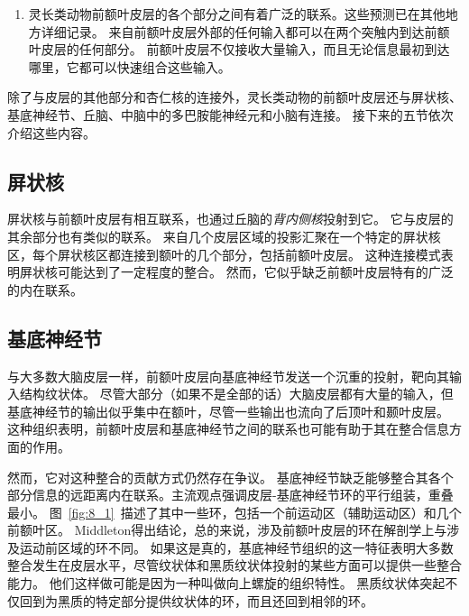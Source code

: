 \begin{enumerate}
\item 灵长类动物前额叶皮层的各个部分之间有着广泛的联系。这些预测已在其他地方详细记录\cite{barbas1988anatomic,carmichael1995sensory,barbas1999medial,petrides1999dorsolateral,petrides2002association,price1999delineating}。
来自前额叶皮层外部的任何输入都可以在两个突触内到达前额叶皮层的任何部分\cite{averbeck2008statistical}。
前额叶皮层不仅接收大量输入，而且无论信息最初到达哪里，它都可以快速组合这些输入。
\end{enumerate}
\par


除了与皮层的其他部分和杏仁核的连接外，灵长类动物的前额叶皮层还与屏状核、基底神经节、丘脑、中脑中的多巴胺能神经元和小脑有连接。
接下来的五节依次介绍这些内容。



\subsection{屏状核}
\par

屏状核与前额叶皮层有相互联系\cite{tanne2002projections}，也通过丘脑的\textit{背内侧核}投射到它\cite{erickson2004subcortical}。
它与皮层的其余部分也有类似的联系。
来自几个皮层区域的投影汇聚在一个特定的屏状核区，每个屏状核区都连接到额叶的几个部分，包括前额叶皮层\cite{tanne2002projections}。
这种连接模式表明屏状核可能达到了一定程度的整合。
然而，它似乎缺乏前额叶皮层特有的广泛的内在联系。



\subsection{基底神经节}
\par

与大多数大脑皮层一样，前额叶皮层向基底神经节发送一个沉重的投射，靶向其输入结构纹状体。
尽管大部分（如果不是全部的话）大脑皮层都有大量的输入，但基底神经节的输出似乎集中在额叶，尽管一些输出也流向了后顶叶\cite{clower2005basal}和颞叶皮层\cite{middleton1996temporal}。
这种组织表明，前额叶皮层和基底神经节之间的联系也可能有助于其在整合信息方面的作用。
\par


然而，它对这种整合的贡献方式仍然存在争议。
基底神经节缺乏能够整合其各个部分信息的远距离内在联系。主流观点强调皮层-基底神经节环的平行组装，重叠最小\cite{alexander1991basal,nakano2000neural}。
图~\ref{fig:8_1}~描述了其中一些环，包括一个前运动区（辅助运动区）和几个前额叶区。
Middleton\cite{middleton2000basal}得出结论，总的来说，涉及前额叶皮层的环在解剖学上与涉及运动前区域的环不同。
如果这是真的，基底神经节组织的这一特征表明大多数整合发生在皮层水平，尽管纹状体和黑质纹状体投射的某些方面可以提供一些整合能力。
他们这样做可能是因为一种叫做向上螺旋的组织特性\cite{haber2000striatonigrostriatal}。
黑质纹状体突起不仅回到为黑质的特定部分提供纹状体的环，而且还回到相邻的环。



